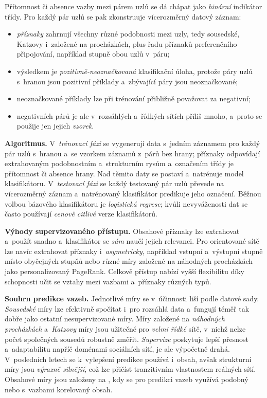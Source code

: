 \documentclass[11pt,a4paper]{article}
\theoremstyle{definition}
\begin{document}
\begin{defbox}
Přítomnost či absence vazby mezi párem uzlů se dá chápat jako \emph{binární} indikátor třídy.
Pro každý pár uzlů se pak zkonstruuje vícerozměrný datový záznam:
\begin{itemize}
\item \emph{příznaky} zahrnují všechny různé podobnosti mezi uzly, tedy sousedské, Katzovy
      i~založené na procházkách, plus řadu příznaků preferenčního připojování, například stupně
      obou uzlů v~páru;
\item výsledkem je \emph{pozitivně-neoznačkovaná} klasifikační úloha, protože páry uzlů
      s~hranou jsou pozitivní příklady a~zbývající páry jsou neoznačkované;
\item neoznačkované příklady lze při trénování přibližně považovat za negativní;
\item negativních párů je ale v~rozsáhlých a~řídkých sítích příliš mnoho, a~proto se použije jen
      jejich \emph{vzorek}.
\end{itemize}

\textbf{Algoritmus.} V~\emph{trénovací fázi} se vygenerují data s~jedním záznamem pro každý pár
uzlů s~hranou a~se vzorkem záznamů z~párů bez hrany; příznaky odpovídají extrahovaným
podobnostním a~strukturním rysům a~označením třídy je přítomnost či absence hrany. Nad těmito
daty se postaví a~natrénuje model klasifikátoru. V~\emph{testovací fázi} se každý testovaný pár
uzlů převede na vícerozměrný záznam a~natrénovaný klasifikátor predikuje jeho označení. Běžnou
volbou bázového klasifikátoru je \emph{logistická regrese}; kvůli nevyváženosti dat se často
používají \emph{cenově citlivé} verze klasifikátorů.

\textbf{Výhody supervizovaného přístupu.} Obsahové příznaky lze extrahovat a~použít snadno
a~klasifikátor se \emph{sám} naučí jejich relevanci. Pro orientované sítě lze navíc extrahovat
příznaky i~\emph{asymetricky}, například vstupní a~výstupní stupně místo obyčejných stupňů nebo
různé míry založené na náhodných procházkách jako personalizovaný PageRank. Celkově přístup
nabízí vyšší flexibilitu díky schopnosti učit se vztahy mezi vazbami a~příznaky různých typů.
\end{defbox}

\textbf{Souhrn predikce vazeb.} Jednotlivé míry se v~účinnosti liší podle datové sady.
\emph{Sousedské} míry lze efektivně spočítat i~pro rozsáhlá data a~fungují téměř tak dobře jako
ostatní nesupervizované míry. Míry založené na \emph{náhodných procházkách} a~\emph{Katzovy}
míry jsou užitečné pro \emph{velmi řídké} sítě, v~nichž nelze počet společných sousedů robustně
změřit. \emph{Supervize} poskytuje lepší přesnost a~adaptabilitu napříč doménami sociálních
sítí, je ale výpočetně drahá. V~posledních letech se k~vylepšení predikce používá i~obsah, avšak
strukturní míry jsou \emph{výrazně silnější}, což lze přičíst tranzitivním vlastnostem reálných
sítí. Obsahové míry jsou založeny na , kdy se pro predikci vazeb využívá
podobný nebo s~vazbami korelovaný obsah.
\end{document}
